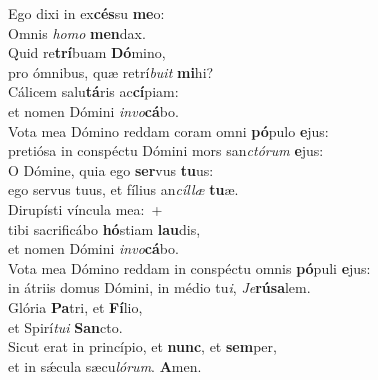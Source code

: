 \evenverse Ego dixi in ex\textbf{cés}su \textbf{me}o:~\*\\
\evenverse Omnis \textit{ho}\textit{mo} \textbf{men}dax.\\
\oddverse Quid re\textbf{trí}buam \textbf{Dó}mino,~\*\\
\oddverse pro ómnibus, quæ retrí\textit{bu}\textit{it} \textbf{mi}hi?\\
\evenverse Cálicem salu\textbf{tá}ris ac\textbf{cí}piam:~\*\\
\evenverse et nomen Dómini \textit{in}\textit{vo}\textbf{cá}bo.\\
\oddverse Vota mea Dómino reddam coram omni \textbf{pó}pulo \textbf{e}jus:~\*\\
\oddverse pretiósa in conspéctu Dómini mors san\textit{ctó}\textit{rum} \textbf{e}jus:\\
\evenverse O Dómine, quia ego \textbf{ser}vus \textbf{tu}us:~\*\\
\evenverse ego servus tuus, et fílius an\textit{cíl}\textit{læ} \textbf{tu}æ.\\
\oddverse Dirupísti víncula mea:~+\\
\oddverse  tibi sacrificábo \textbf{hó}stiam \textbf{lau}dis,~\*\\
\oddverse et nomen Dómini \textit{in}\textit{vo}\textbf{cá}bo.\\
\evenverse Vota mea Dómino reddam in conspéctu omnis \textbf{pó}puli \textbf{e}jus:~\*\\
\evenverse in átriis domus Dómini, in médio tu\textit{i}, \textit{Je}\textbf{rú}\textbf{sa}lem.\\
\oddverse Glória \textbf{Pa}tri, et \textbf{Fí}lio,~\*\\
\oddverse et Spirí\textit{tu}\textit{i} \textbf{San}cto.\\
\evenverse Sicut erat in princípio, et \textbf{nunc}, et \textbf{sem}per,~\*\\
\evenverse et in sǽcula sæcu\textit{ló}\textit{rum}. \textbf{A}men.\\
